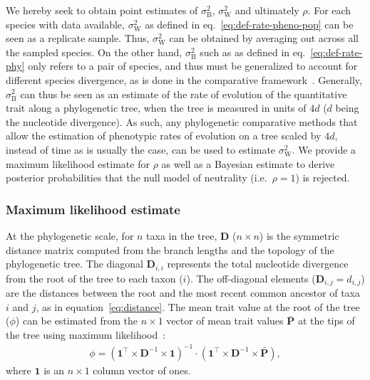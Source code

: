 \documentclass{article}
\newcommand{\Multiply}{\cdot}
\newcommand{\MultiplyMatrix}{\times}
\newcommand{\UniDimArray}[1]{\bm{#1}}
\newcommand{\BiDimArray}[1]{\bm{#1}}
\newcommand{\tr}{^{\intercal}}
\newcommand{\inv}{^{-1}}
\newcommand{\Spi}{i}
\newcommand{\Spj}{j}
\newcommand{\NbrTaxa}{n}
\newcommand{\NucDiv}{d_{\Spi, \Spj}}
\newcommand{\Trait}{P}
\newcommand{\VecTrait}{\UniDimArray{\bar{\Trait}}}
\newcommand{\RootTrait}{\phi}
\newcommand{\VecOne}{\UniDimArray{1}}
\newcommand{\Distance}{\BiDimArray{D}}
\newcommand{\DistanceMatrix}{\BiDimArray{\Distance}}
\newcommand{\RateBetween}{\sigma^2_{\mathrm{B}}}
\newcommand{\RateWhithin}{\sigma^2_{\mathrm{W}}}
\newcommand{\NI}{\rho}
\begin{document}
We hereby seek to obtain point estimates of $\RateBetween$, $\RateWhithin$ and ultimately $\NI$.
For each species with data available, $\RateWhithin$ as defined in eq.~\ref{eq:def-rate-pheno-pop} can be seen as a replicate sample.
Thus, $\RateWhithin$ can be obtained by averaging out across all the sampled species.
On the other hand, $\RateBetween$ such as as defined in eq.~\ref{eq:def-rate-phy} only refers to a pair of species, and thus must be generalized to account for different species divergence, as is done in the comparative framework~\citep{felsenstein_phylogenies_1985, omeara_testing_2006}.
Generally, $\RateBetween$ can thus be seen as an estimate of the rate of evolution of the quantitative trait along a phylogenetic tree, when the tree is measured in units of $4d$ ($d$ being the nucleotide divergence).
As such, any phylogenetic comparative methods that allow the estimation of phenotypic rates of evolution on a tree scaled by $4d$, instead of time as is usually the case, can be used to estimate $\RateWhithin$.
We provide a maximum likelihood estimate for $\NI$ as well as a Bayesian estimate to derive posterior probabilities that the null model of neutrality (i.e.~$\NI = 1$) is rejected.

\subsubsection*{Maximum likelihood estimate}
At the phylogenetic scale, for $\NbrTaxa$ taxa in the tree, $\DistanceMatrix$ ($\NbrTaxa \times \NbrTaxa$) is the symmetric distance matrix computed from the branch lengths and the topology of the phylogenetic tree.
The diagonal $\Distance_{\Spi,\Spi}$ represents the total nucleotide divergence from the root of the tree to each taxon ($\Spi$).
The off-diagonal elements ($\Distance_{\Spi,\Spj} = \NucDiv$) are the distances between the root and the most recent common ancestor of taxa $\Spi$ and $\Spj$, as in equation~\ref{eq:distance}.
The mean trait value at the root of the tree ($\RootTrait$) can be estimated from the $\NbrTaxa \times 1$ vector of mean trait values $\VecTrait$ at the tips of the tree using maximum likelihood~\citep{omeara_testing_2006}:
\begin{gather}
    \RootTrait = \left( \VecOne\tr \MultiplyMatrix \DistanceMatrix\inv \MultiplyMatrix \VecOne \right)\inv \Multiply \left( \VecOne\tr \MultiplyMatrix \DistanceMatrix\inv \MultiplyMatrix \VecTrait \right), \label{eq:estimated-root-trait}
\end{gather}
where $\VecOne$ is an $\NbrTaxa \times 1$ column vector of ones.
\end{document}
